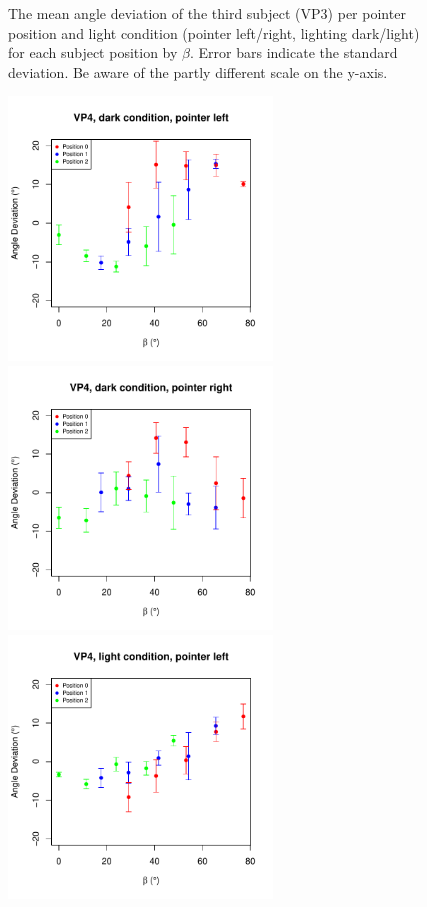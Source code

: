 \begin{figure}
    \caption{The mean angle deviation of the third subject (VP3) per pointer position and light condition (pointer left/right, lighting dark/light) for each subject position by $\beta$. Error bars indicate the standard deviation. Be aware of the partly different scale on the y-axis.} 
    \label{DeviationVP3}
\end{figure}
\begin{figure}
    \includegraphics[width = 7cm]{Images/plots/AngleDevVP4DarkLeft.pdf}
    \includegraphics[width = 7cm]{Images/plots/AngleDevVP4DarkRight.pdf}
    \includegraphics[width = 7cm]{Images/plots/AngleDevVP4LightLeft.pdf}

\end{figure}
